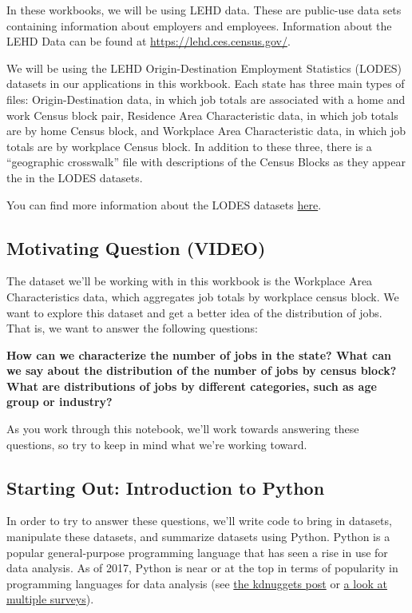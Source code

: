 \documentclass[11pt]{article}
\begin{document}
In these workbooks, we will be using LEHD data. These are public-use
data sets containing information about employers and employees.
Information about the LEHD Data can be found at
\url{https://lehd.ces.census.gov/}.

We will be using the LEHD Origin-Destination Employment Statistics
(LODES) datasets in our applications in this workbook. Each state has
three main types of files: Origin-Destination data, in which job totals
are associated with a home and work Census block pair, Residence Area
Characteristic data, in which job totals are by home Census block, and
Workplace Area Characteristic data, in which job totals are by workplace
Census block. In addition to these three, there is a ``geographic
crosswalk'' file with descriptions of the Census Blocks as they appear
the in the LODES datasets.

You can find more information about the LODES datasets
\href{https://lehd.ces.census.gov/data/lodes/LODES7/LODESTechDoc7.3.pdf}{here}.

    \hypertarget{motivating-question-video}{%
\subsection{\texorpdfstring{{Motivating Question
(VIDEO)}}{Motivating Question (VIDEO)}}\label{motivating-question-video}}

The dataset we'll be working with in this workbook is the Workplace Area
Characteristics data, which aggregates job totals by workplace census
block. We want to explore this dataset and get a better idea of the
distribution of jobs. That is, we want to answer the following
questions:

\textbf{How can we characterize the number of jobs in the state? What
can we say about the distribution of the number of jobs by census block?
What are distributions of jobs by different categories, such as age
group or industry?}

As you work through this notebook, we'll work towards answering these
questions, so try to keep in mind what we're working toward.

    \hypertarget{starting-out-introduction-to-python}{%
\subsection{Starting Out: Introduction to
Python}\label{starting-out-introduction-to-python}}

In order to try to answer these questions, we'll write code to bring in
datasets, manipulate these datasets, and summarize datasets using
Python. Python is a popular general-purpose programming language that
has seen a rise in use for data analysis. As of 2017, Python is near or
at the top in terms of popularity in programming languages for data
analysis (see
\href{https://www.kdnuggets.com/2017/05/poll-analytics-data-science-machine-learning-software-leaders.html}{the
kdnuggets post} or
\href{http://makemeanalyst.com/most-popular-languages-for-data-science-and-analytics-2017/}{a
look at multiple surveys}).
\end{document}
